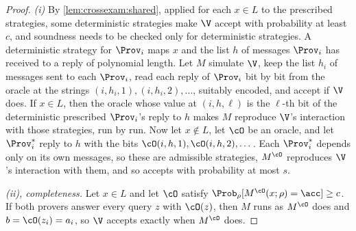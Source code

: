 \begin{refsection}
\begin{proof}
\emph{(i)} By \cref{lem:crossexam:shared}, applied for each $x\in L$ to the prescribed strategies, some deterministic strategies make $\V$ accept with probability at least $c$, and soundness needs to be checked only for deterministic strategies. A deterministic strategy for $\Prov_i$ maps $x$ and the list $h$ of messages $\Prov_i$ has received to a reply of polynomial length. Let $M$ simulate $\V$, keep the list $h_i$ of messages sent to each $\Prov_i$, read each reply of $\Prov_i$ bit by bit from the oracle at the strings $(i,h_i,1),(i,h_i,2),\dots$, suitably encoded, and accept if $\V$ does. If $x\in L$, then the oracle whose value at $(i,h,\ell)$ is the $\ell$-th bit of the deterministic prescribed $\Prov_i$'s reply to $h$ makes $M$ reproduce $\V$'s interaction with those strategies, run by run. Now let $x\notin L$, let $\cO$ be an oracle, and let $\Prov_i^*$ reply to $h$ with the bits $\cO(i,h,1),\cO(i,h,2),\dots$. Each $\Prov_i^*$ depends only on its own messages, so these are admissible strategies, $M^{\cO}$ reproduces $\V$'s interaction with them, and so accepts with probability at most $s$.

\emph{(ii), completeness.} Let $x\in L$ and let $\cO$ satisfy $\Prob_\rho[M^{\cO}(x;\rho)=\acc]\ge c$. If both provers answer every query $z$ with $\cO(z)$, then $M$ runs as $M^{\cO}$ does and $b=\cO(z_i)=a_i$, so $\V$ accepts exactly when $M^{\cO}$ does.


\end{proof}
\end{refsection}
